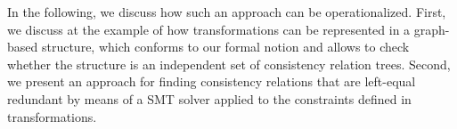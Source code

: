 In the following, we discuss how such an approach can be operationalized.
First, we discuss at the example of \qvtr how transformations can be represented in a graph-based structure, which conforms to our formal notion and allows to check whether the structure is an independent set of consistency relation trees.
Second, we present an approach for finding consistency relations that are left-equal redundant by means of a \gls{SMT} solver applied to the constraints defined in \qvtr transformations.


